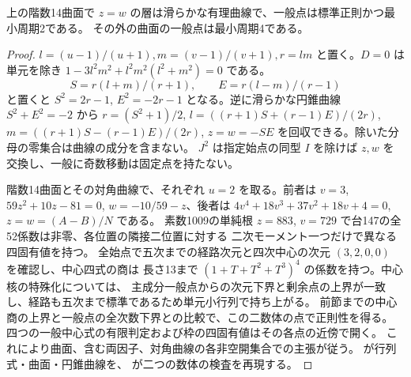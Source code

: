 \begin{proposition}\label{prop:second-rectangle-rank-fourteen-period}
上の階数14曲面で $z=w$ の層は滑らかな有理曲線で、一般点は標準正則かつ最小周期2である。
その外の曲面の一般点は最小周期4である。
\end{proposition}
\begin{proof}
$l=(u-1)/(u+1),m=(v-1)/(v+1),r=lm$ と置く。$D=0$ は単元を除き
$1-3l^2m^2+l^2m^2(l^2+m^2)=0$ である。
\[
 S=r(l+m)/(r+1),\qquad E=r(l-m)/(r-1)
\]
と置くと $S^2=2r-1$, $E^2=-2r-1$ となる。逆に滑らかな円錐曲線 $S^2+E^2=-2$ から
$r=(S^2+1)/2$, $l=((r+1)S+(r-1)E)/(2r)$, $m=((r+1)S-(r-1)E)/(2r)$,
$z=w=-SE$ を回収できる。除いた分母の零集合は曲線の成分を含まない。
$J^2$ は指定始点の同型 $I$ を除けば $z,w$ を交換し、一般に奇数移動は固定点を持たない。

階数14曲面とその対角曲線で、それぞれ $u=2$ を取る。前者は $v=3$,
$59z^2+10z-81=0$, $w=-10/59-z$、後者は
$4v^4+18v^3+37v^2+18v+4=0$, $z=w=(A-B)/N$ である。
素数1009の単純根 $z=883$, $v=729$ で台147の全52係数は非零、各位置の隣接二位置に対する
二次モーメント一つだけで異なる四固有値を持つ。
全始点で五次までの経路次元と四次中心の次元 $(3,2,0,0)$ を確認し、中心四式の商は
長さ13まで $(1+T+T^2+T^3)^4$ の係数を持つ。中心核の特殊化については、
主成分一般点からの次元下界と剰余点の上界が一致し、経路も五次まで標準であるため単元小行列で持ち上がる。
前節までの中心商の上界と一般点の全次数下界との比較で、この二数体の点で正則性を得る。
四つの一般中心式の有限判定および枠の四固有値はその各点の近傍で開く。
これにより曲面、含む両因子、対角曲線の各非空開集合での主張が従う。
 が行列式・曲面・円錐曲線を、
 が二つの数体の検査を再現する。
\end{proof}
